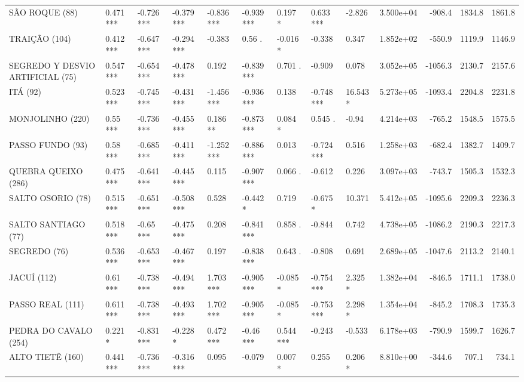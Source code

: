 \documentclass[12pt,oneside]{book}\usepackage[]{graphicx}\usepackage[]{color}
\newenvironment{knitrout}{}{} %
\theoremstyle{definition} %
\begin{document}
\begin{knitrout}
\begin{landscape}
\begin{table}
{\begin{tabular}[t]{lllllllllrrrr}
SÃO ROQUE (88) & 0.471 *** & -0.726 *** & -0.379 *** & -0.836 *** & -0.939 *** & 0.197 * & 0.633 *** & -2.826 & 3.500e+04 & -908.4 & 1834.8 & 1861.8\\
\rowcolor{gray!6}  TRAIÇÃO (104) & 0.412 *** & -0.647 *** & -0.294 *** & -0.383 & 0.56 . & -0.016 * & -0.338 & 0.347 & 1.852e+02 & -550.9 & 1119.9 & 1146.9\\
SEGREDO Y DESVIO ARTIFICIAL (75) & 0.547 *** & -0.654 *** & -0.478 *** & 0.192 & -0.839 *** & 0.701 . & -0.909 & 0.078 & 3.052e+05 & -1056.3 & 2130.7 & 2157.6\\
\rowcolor{gray!6}  ITÁ (92) & 0.523 *** & -0.745 *** & -0.431 *** & -1.456 *** & -0.936 *** & 0.138 & -0.748 *** & 16.543 * & 5.273e+05 & -1093.4 & 2204.8 & 2231.8\\
\addlinespace
MONJOLINHO (220) & 0.55 *** & -0.736 *** & -0.455 *** & 0.186 ** & -0.873 *** & 0.084 * & 0.545 . & -0.94 & 4.214e+03 & -765.2 & 1548.5 & 1575.5\\
\rowcolor{gray!6}  PASSO FUNDO (93) & 0.58 *** & -0.685 *** & -0.411 *** & -1.252 *** & -0.886 *** & 0.013 & -0.724 *** & 0.516 & 1.258e+03 & -682.4 & 1382.7 & 1409.7\\
QUEBRA QUEIXO (286) & 0.475 *** & -0.641 *** & -0.445 *** & 0.115 & -0.907 *** & 0.066 . & -0.612 & 0.226 & 3.097e+03 & -743.7 & 1505.3 & 1532.3\\
\rowcolor{gray!6}  SALTO OSORIO (78) & 0.515 *** & -0.651 *** & -0.508 *** & 0.528 & -0.442 * & 0.719 & -0.675 * & 10.371 & 5.412e+05 & -1095.6 & 2209.3 & 2236.3\\
SALTO SANTIAGO (77) & 0.518 *** & -0.65 *** & -0.475 *** & 0.208 & -0.841 *** & 0.858 . & -0.844 & 0.742 & 4.738e+05 & -1086.2 & 2190.3 & 2217.3\\
\addlinespace
\rowcolor{gray!6}  SEGREDO (76) & 0.536 *** & -0.653 *** & -0.467 *** & 0.197 & -0.838 *** & 0.643 . & -0.808 & 0.691 & 2.689e+05 & -1047.6 & 2113.2 & 2140.1\\
JACUÍ (112) & 0.61 *** & -0.738 *** & -0.494 *** & 1.703 *** & -0.905 *** & -0.085 * & -0.754 *** & 2.325 * & 1.382e+04 & -846.5 & 1711.1 & 1738.0\\
\rowcolor{gray!6}  PASSO REAL (111) & 0.611 *** & -0.738 *** & -0.493 *** & 1.702 *** & -0.905 *** & -0.085 * & -0.753 *** & 2.298 * & 1.354e+04 & -845.2 & 1708.3 & 1735.3\\
PEDRA DO CAVALO (254) & 0.221 * & -0.831 *** & -0.228 * & 0.472 *** & -0.46 *** & 0.544 *** & -0.243 & -0.533 & 6.178e+03 & -790.9 & 1599.7 & 1626.7\\
\rowcolor{gray!6}  ALTO TIETÊ (160) & 0.441 *** & -0.736 *** & -0.316 *** & 0.095 & -0.079 & 0.007 * & 0.255 & 0.206 * & 8.810e+00 & -344.6 & 707.1 & 734.1\\

\end{tabular}}
\end{table}
\end{landscape}
\end{knitrout}
\end{document}
